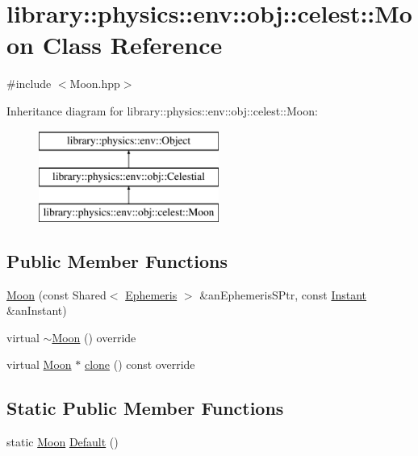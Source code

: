 \hypertarget{classlibrary_1_1physics_1_1env_1_1obj_1_1celest_1_1_moon}{}\section{library\+:\+:physics\+:\+:env\+:\+:obj\+:\+:celest\+:\+:Moon Class Reference}
\label{classlibrary_1_1physics_1_1env_1_1obj_1_1celest_1_1_moon}


{\ttfamily \#include $<$Moon.\+hpp$>$}

Inheritance diagram for library\+:\+:physics\+:\+:env\+:\+:obj\+:\+:celest\+:\+:Moon\+:\begin{figure}[H]
\begin{center}
\leavevmode
\includegraphics[height=3.000000cm]{classlibrary_1_1physics_1_1env_1_1obj_1_1celest_1_1_moon}
\end{center}
\end{figure}
\subsection*{Public Member Functions}
\begin{DoxyCompactItemize}
\item 
\hyperlink{classlibrary_1_1physics_1_1env_1_1obj_1_1celest_1_1_moon_aa7c19c2d391128ca7f4af52915b11261}{Moon} (const Shared$<$ \hyperlink{classlibrary_1_1physics_1_1env_1_1_ephemeris}{Ephemeris} $>$ \&an\+Ephemeris\+S\+Ptr, const \hyperlink{classlibrary_1_1physics_1_1time_1_1_instant}{Instant} \&an\+Instant)
\item 
virtual \hyperlink{classlibrary_1_1physics_1_1env_1_1obj_1_1celest_1_1_moon_aef4e99355b923e8c41ec12237bf41ecb}{$\sim$\+Moon} () override
\item 
virtual \hyperlink{classlibrary_1_1physics_1_1env_1_1obj_1_1celest_1_1_moon}{Moon} $\ast$ \hyperlink{classlibrary_1_1physics_1_1env_1_1obj_1_1celest_1_1_moon_a9d922ab338809a6c1052edbe11ce3e60}{clone} () const override
\end{DoxyCompactItemize}
\subsection*{Static Public Member Functions}
\begin{DoxyCompactItemize}
\item 
static \hyperlink{classlibrary_1_1physics_1_1env_1_1obj_1_1celest_1_1_moon}{Moon} \hyperlink{classlibrary_1_1physics_1_1env_1_1obj_1_1celest_1_1_moon_af9d3870d1a42118ea07d8c25b3c7da52}{Default} ()
\end{DoxyCompactItemize}
